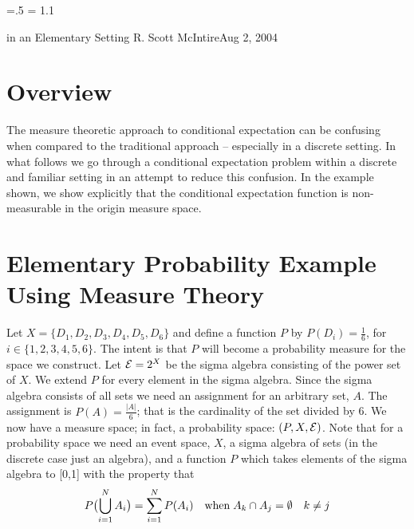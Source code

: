 




\parindent=0pt
\parskip=.5\baselineskip
\baselineskip = 1.1\baselineskip

\footline{\hss\tenrm\folio\hss}

        {in an Elementary Setting}
{R. Scott McIntire}{Aug 2, 2004}

\section{Overview}
The measure theoretic approach to conditional expectation can be confusing
when compared to the traditional approach -- especially in a discrete 
setting. In what follows we go through a conditional 
expectation problem within a discrete and familiar setting in an attempt 
to reduce this confusion. In the example shown, we show explicitly that the 
conditional expectation function is non-measurable in the origin 
measure space.


\section{Elementary Probability Example Using Measure Theory}
Let $X = \{D_1, D_2, D_3, D_4, D_5, D_6\}$ and define a function $P$ by 
$P(D_i) = \frac{1}{6}$, for $i\in \{1,2,3,4,5,6\}$. The intent is that $P$ will 
become a probability measure for the space we construct.
Let ${\cal E} = 2^X$ be the sigma  algebra 
consisting of the power set of $X$. We extend $P$ for every element in the sigma algebra.
Since the sigma algebra consists of all sets 
we need an assignment for an arbitrary set, $A$. 
The assignment is $P(A) = \frac{|A|}{6}$; that is the cardinality of the set divided by 6.
We now have a measure space; in fact, a probability space: $(P,X,{\cal E})$.
Note that for a probability space we need an event space, $X$, a sigma algebra of sets 
(in the discrete case just an algebra), and a function $P$ which takes 
elements of the sigma algebra to [0,1] with the property that 
$$
P\bigl(\mathop{\bigcup}_{i=1}^N A_i\bigr) = \sum_{i=1}^N P(A_i) 
\quad {\rm when}\;  A_k \cap A_j = \emptyset \quad k\neq j
$$

